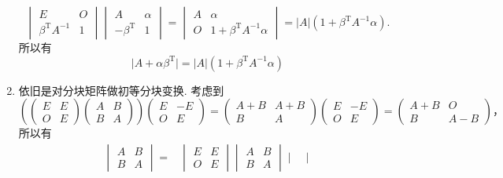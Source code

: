 \begin{enumerate}
\[\begin{vmatrix}
        E & O \\
        \beta^{\mathrm{T}}A^{-1} & 1
    \end{vmatrix} \begin{vmatrix}
        A & \alpha \\
        -\beta^{\mathrm{T}} & 1
    \end{vmatrix} = \begin{vmatrix}
        A & \alpha \\
        O & 1+\beta^{\mathrm{T}}A^{-1}\alpha
    \end{vmatrix} = \lvert A \rvert(1+\beta^{\mathrm{T}}A^{-1}\alpha).\] 所以有 \[\lvert A+\alpha \beta^{\mathrm{T}} \rvert = \lvert A \rvert(1+\beta^{\mathrm{T}}A^{-1}\alpha)\]
    \item 依旧是对分块矩阵做初等分块变换. 考虑到 \[\left(\begin{pmatrix}
        E & E \\
        O & E
    \end{pmatrix} \begin{pmatrix}
        A & B \\
        B & A
    \end{pmatrix} \right)\begin{pmatrix}
        E & -E \\
        O & E
    \end{pmatrix} = \begin{pmatrix}
        A+B & A+B \\
        B & A
    \end{pmatrix} \begin{pmatrix}
        E & -E \\
        O & E
    \end{pmatrix} = \begin{pmatrix}
        A+B & O \\
        B & A-B
    \end{pmatrix}，\] 所以有 \begin{align*}
        \begin{vmatrix}
            A & B \\
            B & A
        \end{vmatrix} ={} & \begin{vmatrix}
            E & E \\
            O & E
        \end{vmatrix} \begin{vmatrix}
            A & B \\
            B & A
        \end{vmatrix} \begin{vmatrix}

\end{vmatrix}
\end{align*}
\end{enumerate}
